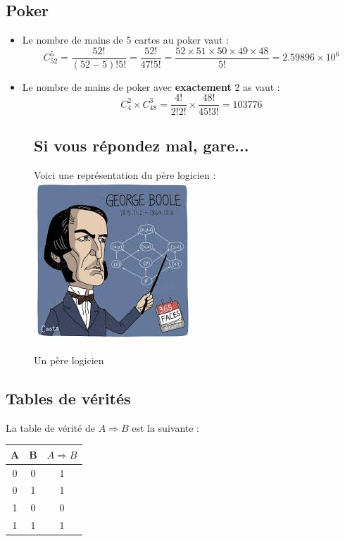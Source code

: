 \documentclass[a4]{article}
\begin{document}
\subsection{Poker}
\begin{itemize}
\item Le nombre de mains de 5 cartes au poker vaut : 
\[ C^{5}_{52}= \frac{52!}{(52-5)!5!} = \frac{52!}{47!5!} = \frac{52 \times 51 \times 50 \times 49 \times 48}{5!} = 2.59896 \times 10^{6}\]
\item Le nombre de mains de poker avec \textbf{exactement} 2 as vaut :
\[ C^{2}_{4} \times C^{3}_{48} = \frac{4!}{2!2!} \times \frac{48!}{45!3!} = 103776 \]
\end{itemize}
\begin{figure}
\subsection{Si vous répondez mal, gare...}
Voici une représentation du père logicien : \\

\centering
\includegraphics[scale=0.5]{boole.jpg}
\caption{Un père logicien}
\label{Figure 3}
\end{figure}

\subsection{Tables de vérités}
La table de vérité de $A \Rightarrow B$ est la suivante :\\

\begin{tabular}{|c|c||c|}
\hline
A & B & $A \Rightarrow B$\\
\hline
\hline
0 & 0 & 1\\
\hline
0 & 1 & 1\\
\hline
1 & 0 & 0\\
\hline
1 & 1 & 1\\
\hline
\end{tabular}\\
\end{document}
